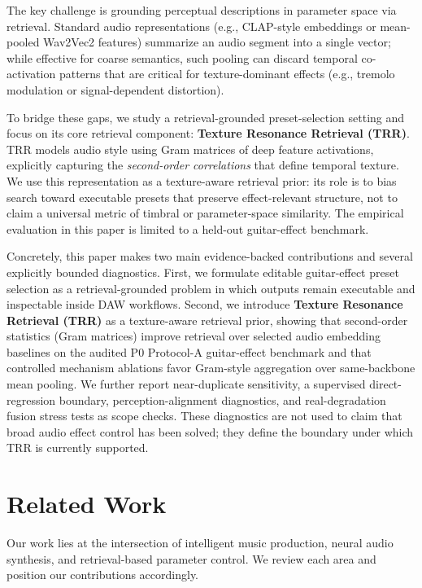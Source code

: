 The key challenge is grounding perceptual descriptions in parameter space via retrieval. Standard audio representations (e.g., CLAP-style embeddings or mean-pooled Wav2Vec2 features) summarize an audio segment into a single vector; while effective for coarse semantics, such pooling can discard temporal co-activation patterns that are critical for texture-dominant effects (e.g., tremolo modulation or signal-dependent distortion).

To bridge these gaps, we study a retrieval-grounded preset-selection setting and focus on its core retrieval component: \textbf{Texture Resonance Retrieval (TRR)}. TRR models audio style using Gram matrices of deep feature activations, explicitly capturing the \textit{second-order correlations} that define temporal texture. We use this representation as a texture-aware retrieval prior: its role is to bias search toward executable presets that preserve effect-relevant structure, not to claim a universal metric of timbral or parameter-space similarity. The empirical evaluation in this paper is limited to a held-out guitar-effect benchmark.

Concretely, this paper makes two main evidence-backed contributions and several explicitly bounded diagnostics. First, we formulate editable guitar-effect preset selection as a retrieval-grounded problem in which outputs remain executable and inspectable inside DAW workflows. Second, we introduce \textbf{Texture Resonance Retrieval (TRR)} as a texture-aware retrieval prior, showing that second-order statistics (Gram matrices) improve retrieval over selected audio embedding baselines on the audited P0 Protocol-A guitar-effect benchmark and that controlled mechanism ablations favor Gram-style aggregation over same-backbone mean pooling. We further report near-duplicate sensitivity, a supervised direct-regression boundary, perception-alignment diagnostics, and real-degradation fusion stress tests as scope checks. These diagnostics are not used to claim that broad audio effect control has been solved; they define the boundary under which TRR is currently supported.

\section{Related Work}
\label{sec:related_work}

Our work lies at the intersection of intelligent music production, neural audio synthesis, and retrieval-based parameter control. We review each area and position our contributions accordingly.

